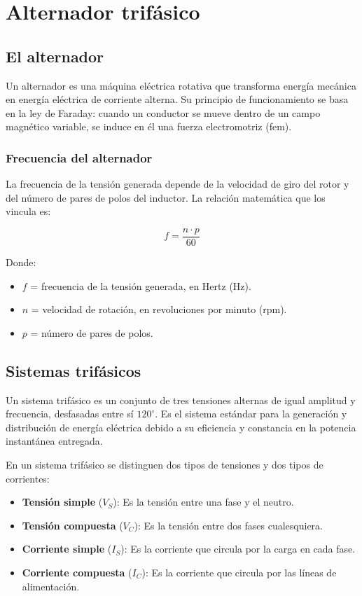 \documentclass[../main]{subfiles}
\begin{document}
\chapter{Alternador trifásico}


\section{El alternador}
Un alternador es una máquina eléctrica rotativa que transforma
energía mecánica en energía eléctrica de corriente alterna. Su
principio de funcionamiento se basa en la ley de Faraday: cuando un
conductor se mueve dentro de un campo magnético variable, se induce
en él una fuerza electromotriz (fem).

\subsection{Frecuencia del alternador}
La frecuencia de la tensión generada depende de la velocidad de giro
del rotor y del número de pares de polos del inductor. La relación
matemática que los vincula es:

\begin{equation}
  f = \frac{n \cdot p}{60}
\end{equation}

Donde:
\begin{itemize}
  \item $f$ = frecuencia de la tensión generada, en Hertz (\unit{Hz}).
  \item $n$ = velocidad de rotación, en revoluciones por minuto (\unit{rpm}).
  \item $p$ = número de pares de polos.
\end{itemize}

\section{Sistemas trifásicos}
Un sistema trifásico es un conjunto de tres tensiones alternas de
igual amplitud y frecuencia, desfasadas entre sí $120^\circ$. Es el
sistema estándar para la generación y distribución de energía
eléctrica debido a su eficiencia y constancia en la potencia
instantánea entregada.

En un sistema trifásico se distinguen dos tipos de tensiones y dos
tipos de corrientes:
\begin{itemize}
  \item \textbf{Tensión simple} ($V_S$): Es la tensión entre una fase
    y el neutro.
  \item \textbf{Tensión compuesta} ($V_C$): Es la tensión entre dos
    fases cualesquiera.
  \item \textbf{Corriente simple} ($I_S$): Es la corriente que circula
    por la carga en cada fase.
  \item \textbf{Corriente compuesta} ($I_C$): Es la corriente que
    circula por las líneas de alimentación.
\end{itemize}
\end{document}
